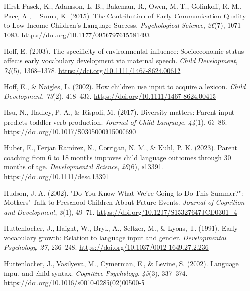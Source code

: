 \documentclass[
  man,floatsintext]{apa6}
\newlength{\cslhangindent}
\newlength{\cslentryspacingunit} %
\newenvironment{CSLReferences}[2] %
 {%
  \setlength{\parindent}{0pt}
  \ifodd #1
  \let\oldpar\par
  \def\par{\hangindent=\cslhangindent\oldpar}
  \fi
  \setlength{\parskip}{#2\cslentryspacingunit}
 }%
 {}
\begin{document}
\begin{CSLReferences}{1}{0}
\leavevmode{}%
Hirsh-Pasek, K., Adamson, L. B., Bakeman, R., Owen, M. T., Golinkoff, R. M., Pace, A., \ldots{} Suma, K. (2015). The {Contribution} of {Early Communication Quality} to {Low-Income Children}'s {Language Success}. \emph{Psychological Science}, \emph{26}(7), 1071--1083. \url{https://doi.org/10.1177/0956797615581493}

\leavevmode{}%
Hoff, E. (2003). The specificity of environmental influence: Socioeconomic status affects early vocabulary development via maternal speech. \emph{Child Development}, \emph{74}(5), 1368--1378. \url{https://doi.org/10.1111/1467-8624.00612}

\leavevmode{}%
Hoff, E., \& Naigles, L. (2002). How children use input to acquire a lexicon. \emph{Child Development}, \emph{73}(2), 418--433. \url{https://doi.org/10.1111/1467-8624.00415}

\leavevmode{}%
Hsu, N., Hadley, P. A., \& Rispoli, M. (2017). Diversity matters: Parent input predicts toddler verb production. \emph{Journal of Child Language}, \emph{44}(1), 63--86. \url{https://doi.org/10.1017/S0305000915000690}

\leavevmode{}%
Huber, E., Ferjan Ramírez, N., Corrigan, N. M., \& Kuhl, P. K. (2023). Parent coaching from 6 to 18 months improves child language outcomes through 30 months of age. \emph{Developmental Science}, \emph{26}(6), e13391. \url{https://doi.org/10.1111/desc.13391}

\leavevmode{}%
Hudson, J. A. (2002). "{Do You Know What We}'re {Going} to {Do This Summer}?": {Mothers}' {Talk} to {Preschool Children About Future Events}. \emph{Journal of Cognition and Development}, \emph{3}(1), 49--71. \url{https://doi.org/10.1207/S15327647JCD0301_4}

\leavevmode{}%
Huttenlocher, J., Haight, W., Bryk, A., Seltzer, M., \& Lyons, T. (1991). Early vocabulary growth: {Relation} to language input and gender. \emph{Developmental Psychology}, \emph{27}, 236--248. \url{https://doi.org/10.1037/0012-1649.27.2.236}

\leavevmode{}%
Huttenlocher, J., Vasilyeva, M., Cymerman, E., \& Levine, S. (2002). Language input and child syntax. \emph{Cognitive Psychology}, \emph{45}(3), 337--374. \url{https://doi.org/10.1016/s0010-0285(02)00500-5}


\end{CSLReferences}
\end{document}
